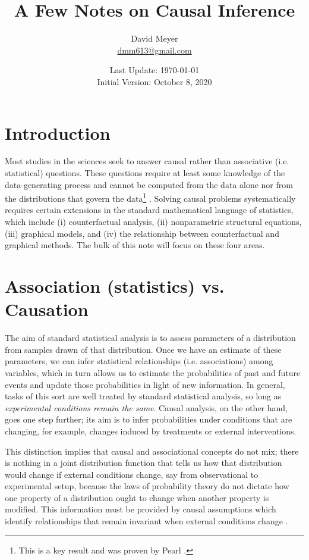 \documentclass[11pt, oneside]{article}   	%
\title{A Few Notes on Causal Inference}
\author{David Meyer \\ \href{mailto:dmm613@gmail.com}
                            {dmm613@gmail.com}}
\date{Last Update: \today \\
	 {\vspace{1.00mm} \small Initial Version: October 8, 2020}}
\begin{document}
\maketitle

\section{Introduction}
Most studies in the sciences seek to answer causal rather than associative (i.e. statistical) questions. These questions require at least some knowledge of the data-generating process and cannot be computed from the data alone nor from the distributions that govern the data\footnote{This is a key result and was proven by Pearl  \cite{Pearl:2009:CMR:1642718}.} . Solving causal problems systematically requires certain extensions in the standard mathematical language of statistics, which include  (i) counterfactual analysis, (ii) nonparametric structural equations, (iii) graphical models, and (iv) the relationship between counterfactual and graphical methods. The bulk of this note will focus on these four areas.

\section{Association (statistics) vs. Causation}

The aim of standard statistical analysis is to assess parameters of a distribution from samples drawn of that distribution. Once we have an estimate of these parameters, we 
can infer statistical relationships (i.e. associations) among variables, which in turn allows us to estimate the probabilities of past and future events and update those 
probabilities in light of new information. In general, tasks of this sort are well treated by standard statistical analysis, so long as \emph{experimental conditions 
remain the same}. Causal analysis, on the other hand, goes one step further; its aim is to infer probabilities under conditions that are changing, for example, changes 
induced by treatments or external interventions.

\noindent
This distinction implies that causal and associational concepts do not mix; there is nothing in a joint distribution function that tells us how that distribution would change
if external conditions change, say from observational to experimental setup, because the laws of probability theory do not dictate how one property of a distribution ought
to change when another property is modified. This information must be provided by causal assumptions which identify relationships that remain invariant when external 
conditions change \cite{2015arXiv150101332P}.
\end{document}
